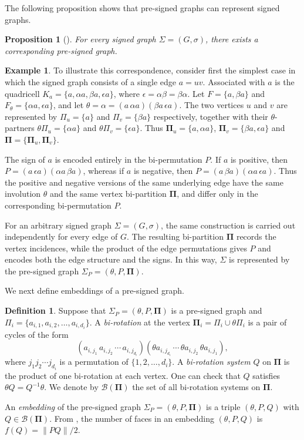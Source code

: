 \documentclass[12pt]{article}
\newtheorem{proposition}[theorem]{Proposition}
\theoremstyle{definition}
\newtheorem{definition}[theorem]{Definition}
\newtheorem{example}[theorem]{Example}
\begin{document}
The following proposition shows that pre-signed graphs can represent signed graphs.

\begin{proposition}[\cite{Chen2026PreSigned}]\label{p2:2}
For every signed graph $\Sigma=(G,\sigma)$, there exists a corresponding pre-signed graph.
\end{proposition}

\begin{example}  To illustrate this correspondence, consider first the simplest case in which the signed graph consists of a single edge $a=uv$. Associated with $a$ is the quadricell $K_a=\{a,\alpha a,\beta a,\epsilon a\}$, where $\epsilon=\alpha\beta=\beta\alpha$. Let $F=\{a,\beta a\}$ and $F_{\theta}=\{\alpha a,\epsilon a\}$, and let $\theta=\alpha=(a\,\alpha a)(\beta a\,\epsilon a)$. The two vertices $u$ and $v$ are represented by $\Pi_u=\{a\}$ and $\Pi_v=\{\beta a\}$ respectively, together with their $\theta$-partners $\theta\Pi_u=\{\alpha a\}$ and $\theta\Pi_v=\{\epsilon a\}$. Thus $\mathbf{\Pi}_u=\{a,\alpha a\}$, $\mathbf{\Pi}_v=\{\beta a,\epsilon a\}$ and $\mathbf{\Pi}=\{\mathbf{\Pi}_u, \mathbf{\Pi}_v\}.$

The sign of $a$ is encoded entirely in the bi-permutation $P$. If $a$ is positive, then $P=(a\,\epsilon a)(\alpha a\,\beta a)$, whereas if $a$ is negative, then $P=(a\,\beta a)(\alpha a\,\epsilon a)$. Thus the positive and negative versions of the same underlying edge have the same involution $\theta$ and the same vertex bi-partition $\mathbf{\Pi}$, and differ only in the corresponding bi-permutation $P$.

For an arbitrary signed graph $\Sigma=(G,\sigma)$, the same construction is carried out independently for every edge of $G$. The resulting bi-partition $\mathbf{\Pi}$ records the vertex incidences, while the product of the edge permutations gives $P$ and encodes both the edge structure and the signs. In this way, $\Sigma$ is represented by the pre-signed graph
$\Sigma_P=(\theta, P, \mathbf{\Pi}).$
\end{example}

We next define embeddings of a pre-signed graph.
\begin{definition} Suppose that $\Sigma_P=(\theta,P,\mathbf{\Pi})$ is a pre-signed graph and $\Pi_i=\{a_{i,1},a_{i,2},\ldots,a_{i,d_i}\}$. A \emph{bi-rotation} at the vertex $\mathbf{\Pi}_i=\Pi_i\cup\theta\Pi_i$ is a pair of cycles of the form $$(a_{i,j_1}\,a_{i,j_2}\,\cdots\,a_{i,j_{d_i}})(\theta a_{i,j_{d_i}}\,\cdots\,\theta a_{i,j_2}\,\theta a_{i,j_1}),$$ where $j_1j_2\cdots j_{d_i}$ is a permutation of $\{1,2,\ldots,d_i\}$. A \emph{bi-rotation system} $Q$ on $\mathbf{\Pi}$ is the product of one bi-rotation at each vertex. One can check that $Q$ satisfies $\theta Q=Q^{-1} \theta$. We denote by $\mathcal B(\mathbf{\Pi})$ the set of all bi-rotation systems on $\mathbf{\Pi}$.

An \emph{embedding} of the pre-signed graph $\Sigma_P=(\theta,P,\mathbf{\Pi})$ is a triple $(\theta,P,Q)$ with $Q\in\mathcal B(\mathbf{\Pi})$.
From \cite{Chen2026PreSigned}, the number of faces in an embedding $(\theta,P,Q)$ is
$f(Q)=\lVert PQ\rVert/2.$
\end{definition}
\end{document}
